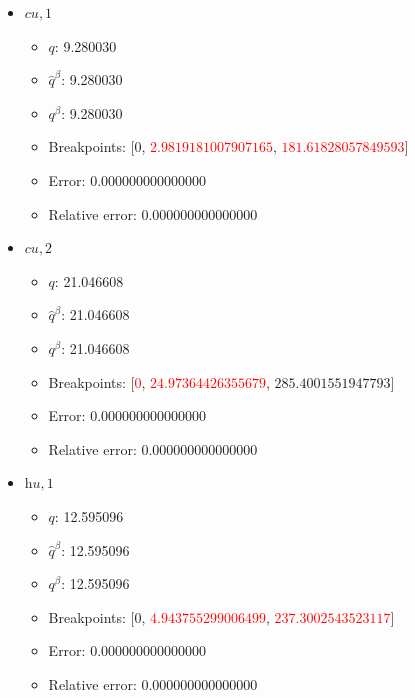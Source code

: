 \documentclass{article}%
\begin{document}
\begin{itemize}
\begin{itemize}
		\item Error: 0.000000000000000%
		\item Relative error: 0.000000000000000%
	\end{itemize}%
	\item $\textit{cu},1$%
	\begin{itemize}%
		\item $q$: 9.280030%
		\item $\hat{q}^\beta$: 9.280030%
		\item $q^\beta$: 9.280030%
		\item Breakpoints: $[$$0$, \textcolor{red}{$2.9819181007907165$}, \textcolor{red}{$181.61828057849593$}$]$%
		\item Error: 0.000000000000000%
		\item Relative error: 0.000000000000000%
	\end{itemize}%
	\item $\textit{cu},2$%
	\begin{itemize}%
		\item $q$: 21.046608%
		\item $\hat{q}^\beta$: 21.046608%
		\item $q^\beta$: 21.046608%
		\item Breakpoints: $[$\textcolor{red}{$0$}, \textcolor{red}{$24.97364426355679$}, $285.4001551947793$$]$%
		\item Error: 0.000000000000000%
		\item Relative error: 0.000000000000000%
	\end{itemize}%
	\item $\textit{hu},1$%
	\begin{itemize}%
		\item $q$: 12.595096%
		\item $\hat{q}^\beta$: 12.595096%
		\item $q^\beta$: 12.595096%
		\item Breakpoints: $[$$0$, \textcolor{red}{$4.943755299006499$}, \textcolor{red}{$237.3002543523117$}$]$%
		\item Error: 0.000000000000000%
		\item Relative error: 0.000000000000000%
	\end{itemize}%
\end{itemize}%
\end{document}
